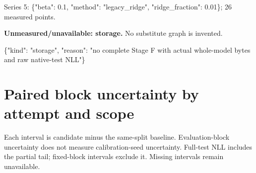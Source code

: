 \documentclass[10pt]{article}
\begin{document}
\noindent\footnotesize Series 5: \{"beta": 0.1, "method": "legacy\_ridge", "ridge\_fraction": 0.01\}; 26 measured points.\par
\par\textbf{Unmeasured/unavailable: storage.} No substitute graph is invented.
\par\small \{"kind": "storage", "reason": "no complete Stage F with actual whole-model bytes and raw native-test NLL"\}
\appendix\section{Paired block uncertainty by attempt and scope}
Each interval is candidate minus the same-split baseline. Evaluation-block uncertainty does not measure calibration-seed uncertainty. Full-test NLL includes the partial tail; fixed-block intervals exclude it. Missing intervals remain unavailable.
\end{document}
